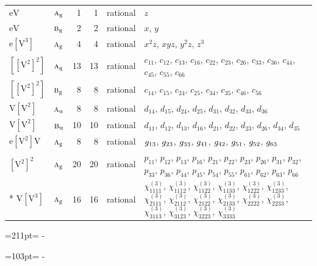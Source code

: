 \documentclass[10pt,a4paper]{article}
\newcommand{\needspace}[1]{\par\penalty-100\begingroup\dimen0=#1\relax\dimen2=\pagegoal
  \advance\dimen2-\pagetotal\ifdim\dimen0>\dimen2\relax\ifdim\dimen2>0pt\vfil\break\fi\fi
  \endgroup}
\numberwithin{equation}{section}
\newcommand{\irr}[1]{\text{\normalfont\scshape #1}}
\newcommand{\ptag}[1]{\mathrm{#1}}
\newcommand{\jahn}[1]{\mathrm{#1}}
\newlength{\fillwidth}\newlength{\cellwidth}\newlength{\colwidth}
\begin{document}
{\begin{longtable}{@{}llrrl>{\RaggedRight\arraybackslash}p{\fillwidth}@{}}
$\jahn{eV}$ & $\irr{a}_{\ptag{g}}$ & 1 & 1 & rational & $z$\\
$\jahn{eV}$ & $\irr{b}_{\ptag{g}}$ & 2 & 2 & rational & $x$, $y$\\
$\jahn{e[V^{3}]}$ & $\irr{a}_{\ptag{g}}$ & 4 & 4 & rational & $x^{2}z$, $xyz$, $y^{2}z$, $z^{3}$\\
$\jahn{[[V^{2}]^{2}]}$ & $\irr{a}_{\ptag{g}}$ & 13 & 13 & rational & $c_{11}$, $c_{12}$, $c_{13}$, $c_{16}$, $c_{22}$, $c_{23}$, $c_{26}$, $c_{33}$, $c_{36}$, $c_{44}$, $c_{45}$, $c_{55}$, $c_{66}$\\
$\jahn{[[V^{2}]^{2}]}$ & $\irr{b}_{\ptag{g}}$ & 8 & 8 & rational & $c_{14}$, $c_{15}$, $c_{24}$, $c_{25}$, $c_{34}$, $c_{35}$, $c_{46}$, $c_{56}$\\
$\jahn{V[V^{2}]}$ & $\irr{a}_{\ptag{u}}$ & 8 & 8 & rational & $d_{14}$, $d_{15}$, $d_{24}$, $d_{25}$, $d_{31}$, $d_{32}$, $d_{33}$, $d_{36}$\\
$\jahn{V[V^{2}]}$ & $\irr{b}_{\ptag{u}}$ & 10 & 10 & rational & $d_{11}$, $d_{12}$, $d_{13}$, $d_{16}$, $d_{21}$, $d_{22}$, $d_{23}$, $d_{26}$, $d_{34}$, $d_{35}$\\
$\jahn{e[V^{2}]V}$ & $\irr{a}_{\ptag{g}}$ & 8 & 8 & rational & $\mathnormal{g}_{13}$, $\mathnormal{g}_{23}$, $\mathnormal{g}_{33}$, $\mathnormal{g}_{41}$, $\mathnormal{g}_{42}$, $\mathnormal{g}_{51}$, $\mathnormal{g}_{52}$, $\mathnormal{g}_{63}$\\
$\jahn{[V^{2}]^{2}}$ & $\irr{a}_{\ptag{g}}$ & 20 & 20 & rational & $p_{11}$, $p_{12}$, $p_{13}$, $p_{16}$, $p_{21}$, $p_{22}$, $p_{23}$, $p_{26}$, $p_{31}$, $p_{32}$, $p_{33}$, $p_{36}$, $p_{44}$, $p_{45}$, $p_{54}$, $p_{55}$, $p_{61}$, $p_{62}$, $p_{63}$, $p_{66}$\\*
$\jahn{V[V^{3}]}$ & $\irr{a}_{\ptag{g}}$ & 16 & 16 & rational & $\chi^{(3)}_{1111}$, $\chi^{(3)}_{1112}$, $\chi^{(3)}_{1122}$, $\chi^{(3)}_{1133}$, $\chi^{(3)}_{1222}$, $\chi^{(3)}_{1233}$, $\chi^{(3)}_{2111}$, $\chi^{(3)}_{2112}$, $\chi^{(3)}_{2122}$, $\chi^{(3)}_{2133}$, $\chi^{(3)}_{2222}$, $\chi^{(3)}_{2233}$, $\chi^{(3)}_{3113}$, $\chi^{(3)}_{3123}$, $\chi^{(3)}_{3223}$, $\chi^{(3)}_{3333}$\\
\bottomrule\end{longtable}}
\needspace{211pt}
\needspace{103pt}
\end{document}
